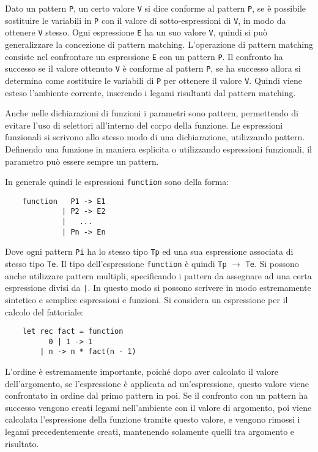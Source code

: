 \documentclass{article}
\numberwithin{equation}{subsection}
\begin{document}
Dato un pattern \verb|P|, un certo valore \verb|V| si dice conforme al pattern \verb|P|, se è possibile sostituire le variabili in \verb|P| con il valore di sotto-espressioni di \verb|V|, in modo da ottenere \verb|V| stesso. 
Ogni espressione \verb|E| ha un suo valore \verb|V|, quindi si può generalizzare la concezione di pattern matching. 
L'operazione di pattern matching consiste nel confrontare un espressione \verb|E| con un pattern \verb|P|. Il confronto ha successo se il valore ottenuto \verb|V| è conforme al pattern \verb|P|, se ha successo allora si determina come sostituire le variabili di \verb|P| per ottenere il valore \verb|V|. Quindi viene esteso l'ambiente corrente, inserendo i legami risultanti dal pattern matching. 


Anche nelle dichiarazioni di funzioni i parametri sono pattern, permettendo di evitare l'uso di selettori all'interno del corpo della funzione. Le espressioni funzionali si scrivono allo stesso modo di una dichiarazione, utilizzando pattern. Definendo una funzione in maniera esplicita o utilizzando espressioni funzionali, il parametro può essere sempre un pattern. 

In generale quindi le espressioni \verb|function| sono della forma:
\begin{verbatim}
    function   P1 -> E1
             | P2 -> E2
             |   ...
             | Pn -> En
\end{verbatim}
Dove ogni pattern \verb|Pi| ha lo stesso tipo \verb|Tp| ed una sua espressione associata di stesso tipo \verb|Te|. 
Il tipo dell'espressione \verb|function| è quindi \verb|Tp| $\rightarrow$ \verb|Te|. Si possono anche utilizzare pattern multipli, specificando i pattern da assegnare ad una certa espressione divisi da \texttt{|}. In questo modo si possono scrivere in modo estremamente sintetico e semplice espressioni e funzioni. Si considera un espressione per il calcolo del fattoriale:
\begin{verbatim}
    let rec fact = function
          0 | 1 -> 1
        | n -> n * fact(n - 1)
\end{verbatim} 


L'ordine è estremamente importante, poiché dopo aver calcolato il valore dell'argomento, se l'espressione è applicata ad un'espressione, questo valore viene confrontato in ordine dal primo pattern in poi. Se il confronto con un pattern ha successo vengono creati legami nell'ambiente con il valore di argomento, poi viene calcolata l'espressione della funzione tramite questo valore, e vengono rimossi i legami precedentemente creati, mantenendo solamente quelli tra argomento e risultato. 
\end{document}

